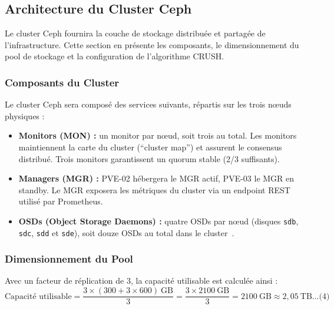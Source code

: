 \subsection{Architecture du Cluster Ceph}

\par Le cluster Ceph fournira la couche de stockage distribuée et partagée de l'infrastructure. Cette section en présente les composants, le dimensionnement du pool de stockage et la configuration de l'algorithme CRUSH.\\

\subsubsection{Composants du Cluster}

\par Le cluster Ceph sera composé des services suivants, répartis sur les trois nœuds physiques :\\

\begin{itemize}
    \item \textbf{Monitors (MON) :} un monitor par nœud, soit trois au total. Les monitors maintiennent la carte du cluster (``cluster map'') et assurent le consensus distribué. Trois monitors garantissent un quorum stable (2/3 suffisants).
    \item \textbf{Managers (MGR) :} PVE-02 hébergera le MGR actif, PVE-03 le MGR en standby. Le MGR exposera les métriques du cluster via un endpoint REST utilisé par Prometheus.
    \item \textbf{OSDs (Object Storage Daemons) :} quatre OSDs par nœud (disques \texttt{sdb}, \texttt{sdc}, \texttt{sdd} et \texttt{sde}), soit douze OSDs au total dans le cluster~\cite{ref33}.
\end{itemize}

\subsubsection{Dimensionnement du Pool}

\par Avec un facteur de réplication de 3, la capacité utilisable est calculée ainsi :\\

\[
\text{Capacité utilisable} = \frac{3 \times (300 + 3 \times 600)\ \text{GB}}{3} = \frac{3 \times 2100\ \text{GB}}{3} = 2100\ \text{GB} \approx 2{,}05\ \text{TB} \text{...(4)}
\]

